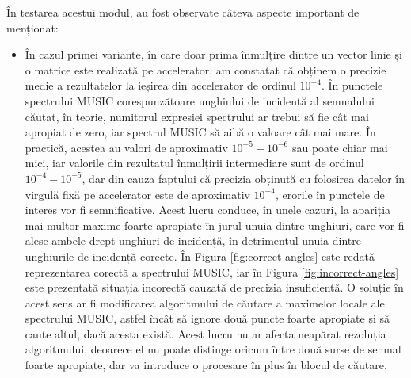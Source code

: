 În testarea acestui modul, au fost observate câteva aspecte important de
menționat:
\begin{itemize}
  \item În cazul primei variante, în care doar prima înmulțire dintre un vector
  linie și o matrice este realizată pe accelerator, am constatat că obținem o
  precizie medie a rezultatelor la ieșirea din accelerator de ordinul $10^{-4}$.
  În punctele spectrului MUSIC corespunzătoare unghiului de incidență al
  semnalului căutat, în teorie, numitorul expresiei spectrului ar trebui să fie
  cât mai apropiat de zero, iar spectrul MUSIC să aibă o valoare cât mai mare.
  În practică, acestea au valori de aproximativ $10^{-5} - 10^{-6}$ sau poate
  chiar mai mici, iar
  valorile din rezultatul înmulțirii intermediare sunt de ordinul $10^{-4} -
  10^{-5}$, dar din cauza faptului că precizia obținută cu folosirea datelor în
  virgulă fixă pe accelerator este de aproximativ $10^{-4}$, erorile în punctele
  de interes vor fi semnificative. Acest lucru conduce, în unele cazuri, la
  apariția mai multor maxime foarte apropiate în jurul unuia dintre unghiuri,
  care vor fi alese ambele drept unghiuri de incidență, în detrimentul unuia
  dintre unghiurile de incidență corecte. În Figura \ref{fig:correct-angles}
  este redată reprezentarea corectă a spectrului MUSIC, iar în Figura
  \ref{fig:incorrect-angles} este prezentată situația incorectă cauzată de
  precizia insuficientă. O soluție în acest sens ar fi modificarea algoritmului
  de căutare a maximelor locale ale spectrului MUSIC, astfel încât să ignore două puncte foarte
  apropiate și să caute altul, dacă acesta există. Acest lucru nu ar afecta
  neapărat rezoluția algoritmului, deoarece el nu poate distinge oricum între
  două surse de semnal foarte apropiate, dar va introduce o procesare în plus în
  blocul de căutare.


\end{itemize}
